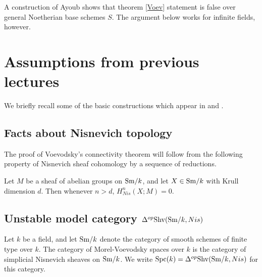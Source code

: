\documentclass{amsart}%
\begin{document}
\begin{remark}
  A construction of Ayoub \cite{Ayoub} shows that theorem \ref{Voev}
  statement is false over general Noetherian base schemes $S$. The
  argument below works for infinite fields, however. 
\end{remark}

\section{Assumptions from previous lectures}

We briefly recall some of the basic constructions which appear in
\cite{Mor03} and \cite{Mor05}. 

\subsection{Facts about Nisnevich topology}

The proof of Voevodsky's connectivity theorem will follow from the
following property of Nisnevich sheaf cohomology by a sequence of
reductions.

\begin{proposition}\cite[2.4.1]{Mor04}
  Let $M$ be a sheaf of abelian groups on $\mathrm{Sm}/k$, and let
  $X \in \mathrm{Sm}/k$ with Krull dimension $d$. Then whenever $n > d$,
  $H^n_{Nis}(X;M) = 0$.
\end{proposition}


\subsection{Unstable model category $\Delta^{op} \mathrm{Shv}(\mathrm{Sm}/k,Nis)$}

\begin{definition}
  Let $k$ be a field, and let $\mathrm{Sm}/k$ denote the category of smooth
  schemes of finite type over $k$. The category of Morel-Voevodsky
  spaces over $k$ is the category of simplicial Nisnevich sheaves on
  $\mathrm{Sm}/k$. We write $\mathrm{Spc}(k) = \Delta^{op}\mathrm{Shv}(\mathrm{Sm}/k, Nis)$ for this
  category.
\end{definition}
\end{document}
